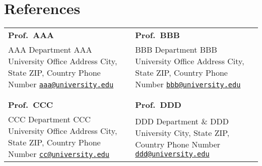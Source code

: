 	\section{References}
	    \begin{tabular}[t]{p{}p{}}  %
		\textbf{Prof.~AAA} & \textbf{Prof.~BBB}\\
		AAA Department\newline
		AAA University\newline
		Office Address\newline
		City, State ZIP, Country\newline
		Phone Number\newline
		\href{mailto:aaa@university.edu}{\nolinkurl{aaa@university.edu}}
		&
		BBB Department\newline
		BBB University\newline
		Office Address\newline
		City, State ZIP, Country\newline
		Phone Number\newline
		\href{mailto:bbb@university.edu}{\nolinkurl{bbb@university.edu}}\\\\\\

		\textbf{Prof.~CCC} & \textbf{Prof.~DDD}\\
		CCC Department\newline
		CCC University\newline
		Office Address\newline
		City, State ZIP, Country\newline
		Phone Number\newline
		\href{mailto:ccc@university.edu}{\nolinkurl{cc@university.edu}}
		&
		DDD Department \&\newline
		DDD University\newline
		City, State ZIP, Country\newline
		Phone Number\newline
		\href{mailto:ddd@university.edu}{\nolinkurl{ddd@university.edu}}
		
	\end{tabular}

